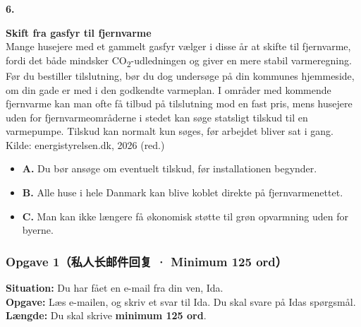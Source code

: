 \vspace{0.25em}
\textbf{\color{NCDRed}6.}
\begin{tcolorbox}[enhanced, breakable, frame hidden, colback=white, borderline={0.85pt}{0pt}{NCDGold, dashed}, arc=2pt, left=9pt, right=9pt, top=6pt, bottom=6pt]
\textbf{Skift fra gasfyr til fjernvarme}\\
Mange husejere med et gammelt gasfyr vælger i disse år at skifte til fjernvarme, fordi det både mindsker CO\textsubscript{2}-udledningen og giver en mere stabil varmeregning. Før du bestiller tilslutning, bør du dog undersøge på din kommunes hjemmeside, om din gade er med i den godkendte varmeplan. I områder med kommende fjernvarme kan man ofte få tilbud på tilslutning mod en fast pris, mens husejere uden for fjernvarmeområderne i stedet kan søge statsligt tilskud til en varmepumpe. Tilskud kan normalt kun søges, før arbejdet bliver sat i gang.\\[2pt]
\null\hfill {\small\color{NCDGray}Kilde: energistyrelsen.dk, 2026 (red.)}
\end{tcolorbox}
\begin{itemize}[leftmargin=1.8em, itemsep=0.12em]
  \item[{\small\fbox{\phantom{\textsf{x}}}}] \textbf{A.} Du bør ansøge om eventuelt tilskud, før installationen begynder.
  \item[{\small\fbox{\phantom{\textsf{x}}}}] \textbf{B.} Alle huse i hele Danmark kan blive koblet direkte på fjernvarmenettet.
  \item[{\small\fbox{\phantom{\textsf{x}}}}] \textbf{C.} Man kan ikke længere få økonomisk støtte til grøn opvarmning uden for byerne.
\end{itemize}


\subsubsection*{Opgave 1（私人长邮件回复 · Minimum 125 ord）}

\textbf{Situation:} Du har fået en e-mail fra din ven, Ida.\\
\textbf{Opgave:} Læs e-mailen, og skriv et svar til Ida. Du skal svare på Idas spørgsmål.\\
\textbf{Længde:} Du skal skrive \textbf{minimum 125 ord}.

